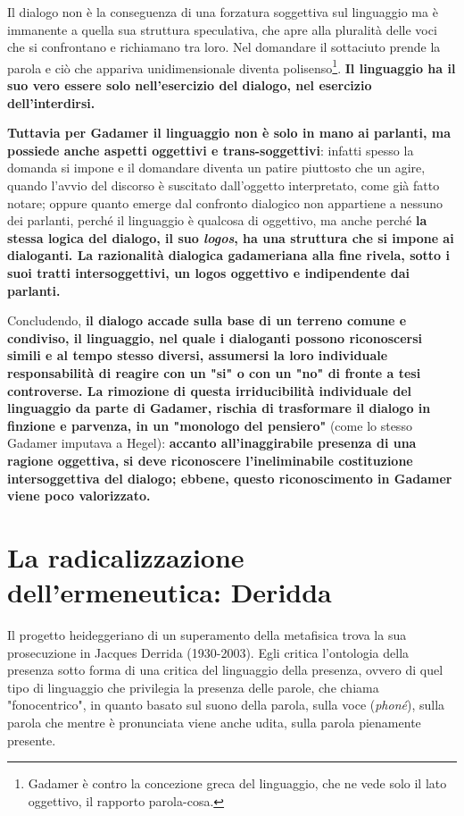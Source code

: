Il dialogo non è la conseguenza di una forzatura soggettiva sul linguaggio ma è immanente a quella sua struttura speculativa, che apre alla pluralità delle voci che si confrontano e richiamano tra loro. Nel domandare il sottaciuto prende la parola e ciò che appariva unidimensionale diventa polisenso\footnote{Gadamer è contro la concezione greca del linguaggio, che ne vede solo il lato oggettivo, il rapporto parola-cosa.}. \textbf{Il linguaggio ha il suo vero essere solo nell'esercizio del dialogo, nel esercizio dell'interdirsi.}

\textbf{Tuttavia per Gadamer il linguaggio non è solo in mano ai parlanti, ma possiede anche aspetti oggettivi e trans-soggettivi}: infatti spesso la domanda si impone e il domandare diventa un patire piuttosto che un agire, quando l'avvio del discorso è suscitato dall'oggetto interpretato, come già fatto notare; oppure quanto emerge dal confronto dialogico non appartiene a nessuno dei parlanti, perché il linguaggio è qualcosa di oggettivo, ma anche perché \textbf{la stessa logica del dialogo, il suo \textit{logos}, ha una struttura che si impone ai dialoganti. La razionalità dialogica gadameriana alla fine rivela, sotto i suoi tratti intersoggettivi, un logos oggettivo e indipendente dai parlanti.}

Concludendo,\textbf{ il dialogo accade sulla base di un terreno comune e condiviso, il linguaggio, nel quale i dialoganti possono riconoscersi simili e al tempo stesso diversi, assumersi la loro individuale responsabilità di reagire con un "si" o con un "no" di fronte a tesi controverse. La rimozione di questa irriducibilità individuale del linguaggio da parte di Gadamer, rischia di trasformare il dialogo in finzione e parvenza, in un "monologo del pensiero"} (come lo stesso Gadamer imputava a Hegel): \textbf{accanto all'inaggirabile presenza di una ragione oggettiva, si deve riconoscere l'ineliminabile costituzione intersoggettiva del dialogo; ebbene, questo riconoscimento in Gadamer viene poco valorizzato.}

\section{La radicalizzazione dell'ermeneutica: Deridda}

Il progetto heideggeriano di un superamento della
metafisica trova la sua prosecuzione in Jacques Derrida
(1930-2003). Egli critica l'ontologia della presenza
sotto forma di una critica del linguaggio della
presenza, ovvero di quel tipo di linguaggio che privilegia
la presenza delle parole, che chiama "fonocentrico",
in quanto basato sul suono della parola, sulla voce
(\textit{phoné}), sulla parola che mentre è pronunciata viene
anche udita, sulla parola pienamente presente.

